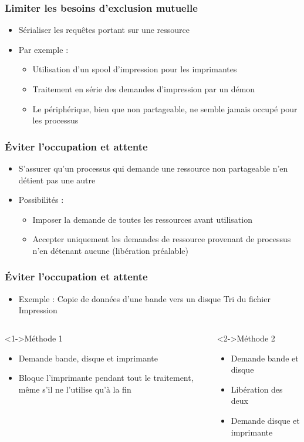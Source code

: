 \begin{frame}
\frametitle{Limiter les besoins d’exclusion mutuelle}
\begin{itemize}
\item Sérialiser les requêtes portant sur une ressource
\item Par exemple :
\begin{itemize}
\item Utilisation d’un spool d’impression pour les imprimantes
\item Traitement en série des demandes d’impression par un démon
\item Le périphérique, bien que non partageable, ne semble jamais occupé pour les processus
\end{itemize}
\end{itemize}
\end{frame}

\begin{frame}
\frametitle{Éviter l’occupation et attente}
\begin{itemize}
\item S’assurer qu’un processus qui demande une ressource non partageable n’en détient pas une autre
\item Possibilités :
\begin{itemize}
\item Imposer la demande de toutes les ressources avant utilisation
\item Accepter uniquement les demandes de ressource provenant de processus n’en détenant aucune (libération préalable)
\end{itemize}
\end{itemize}
\end{frame}

\begin{frame}
\frametitle{Éviter l’occupation et attente}
\begin{itemize}
\item Exemple :
Copie de données d’une bande vers un disque
Tri du fichier
Impression
\end{itemize}
\begin{columns}
\begin{block}<1->{Méthode 1}
\begin{itemize}
\item Demande bande, disque et imprimante
\item Bloque l’imprimante pendant tout le traitement, même s’il ne l’utilise qu’à la fin
\end{itemize}
\end{block}
\begin{block}<2->{Méthode 2}
\begin{itemize}
\item Demande bande et disque
\item Libération des deux
\item Demande disque et imprimante
\end{itemize}
\end{block}
\end{columns}
\end{frame}

